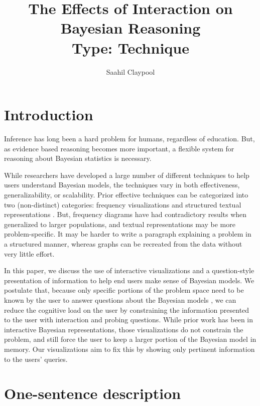 \documentclass{proc}
\begin{document}
\title{%
    The Effects of Interaction on Bayesian Reasoning \\
    \large Type: Technique
}

\author{Saahil Claypool}

\maketitle

\section{Introduction}

Inference has long been a hard problem for humans, 
regardless of education. But, as evidence based reasoning becomes more
important, a flexible system for reasoning about Bayesian statistics is 
necessary. 

While researchers have developed a large number of different techniques to 
help users understand Bayesian models, the techniques vary in both effectiveness,
generalizability, or scalability. Prior effective techniques can be categorized into two (non-distinct) categories: 
frequency visualizations and structured textual representations \cite{Ottley2016}. But, frequency diagrams
have had contradictory results when generalized to larger populations, and textual representations
may be more problem-specific. It may be harder to write a paragraph explaining a problem in a structured manner, whereas
graphs can be recreated from the data without very little effort. 

In this paper, we discuss the use of interactive visualizations and a question-style
presentation of information to help end users make sense of Bayesian models. We postulate that, 
because only specific portions of the problem space need to be known by the user to answer 
questions about the Bayesian models \cite{Gigerenzer1995}, we can reduce the cognitive load on the user by 
constraining the information presented to the user with interaction and probing questions. While prior work has been 
in interactive Bayesian representations, those visualizations do not constrain the problem, and still
force the user to keep a larger portion of the Bayesian model in memory. Our visualizations aim to fix this by 
showing only pertinent information to the users' queries. 



\section{One-sentence description}
\end{document}
